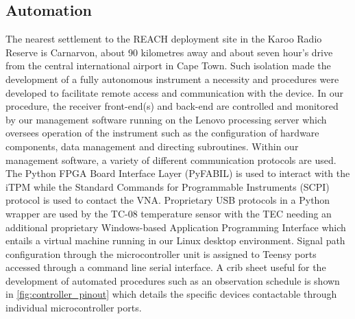 \subsection{Automation}
The nearest settlement to the REACH deployment site in the Karoo Radio Reserve is Carnarvon, about 90 kilometres away and about seven hour’s drive from the central international airport in Cape Town. Such isolation made the development of a fully autonomous instrument a necessity and procedures were developed to facilitate remote access and communication with the device. In our procedure, the receiver front-end(s) and back-end are controlled and monitored by our management software running on the Lenovo processing server which oversees operation of the instrument such as the configuration of hardware components, data management and directing subroutines. Within our management software, a variety of different communication protocols are used. The Python FPGA Board Interface Layer (PyFABIL) is used to interact with the iTPM while the Standard Commands for Programmable Instruments (SCPI) protocol is used to contact the VNA. Proprietary USB protocols in a Python wrapper are used by the TC-08 temperature sensor with the TEC needing an additional proprietary Windows-based Application Programming Interface which entails a virtual machine running in our Linux desktop environment. Signal path configuration through the microcontroller unit is assigned to Teensy ports accessed through a command line serial interface. A crib sheet useful for the development of automated procedures such as an observation schedule is shown in \cref{fig:controller_pinout} which details the specific devices contactable through individual microcontroller ports.
